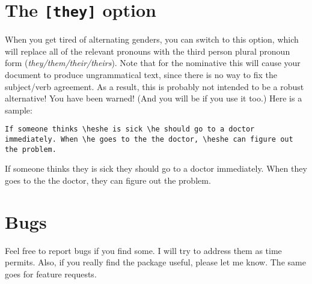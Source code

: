 \documentclass[11pt]{article}
\newcommand*{\pkg}[1]{\texttt{#1}\xspace}
\begin{document}
\section{The \pkg{[they]} option}
When you get tired of alternating genders, you can switch to
this option, which will replace all of the relevant pronouns with the third
person plural pronoun form (\emph{they/them/their/theirs}).  Note that for the nominative
this will cause your document to produce ungrammatical text, since there is 
no way to fix the subject/verb agreement. As a result, this is probably not intended to be a robust alternative! You have been warned! (And you will be if you use it too.) Here is a sample:
\begin{exe}
\ex\label{they}
\begin{xlist}
\ex \begin{lstlisting}
If someone thinks \heshe is sick \he should go to a doctor immediately. When \he goes to the the doctor, \heshe can figure out the problem.
\end{lstlisting}
\ex If someone thinks they is sick they should go to a doctor immediately. When they goes to the the doctor, they can figure out the problem.
\end{xlist}
\end{exe}
\section{Bugs}
Feel free to report bugs if you find some. I will try to address them as time permits. Also,  if you really find the package useful, please let me know.  The same goes for feature requests.
\end{document}
